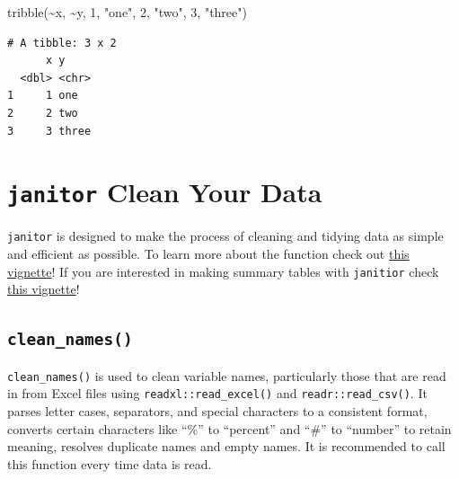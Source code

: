 \documentclass[
  letterpaper,
]{book}
\newenvironment{Shaded}{\begin{snugshade}}{\end{snugshade}}
\newcommand{\DecValTok}[1]{\textcolor[rgb]{0.68,0.00,0.00}{#1}}
\newcommand{\FunctionTok}[1]{\textcolor[rgb]{0.28,0.35,0.67}{#1}}
\newcommand{\NormalTok}[1]{\textcolor[rgb]{0.00,0.23,0.31}{#1}}
\newcommand{\SpecialCharTok}[1]{\textcolor[rgb]{0.37,0.37,0.37}{#1}}
\newcommand{\StringTok}[1]{\textcolor[rgb]{0.13,0.47,0.30}{#1}}
\begin{document}
\begin{Shaded}
\begin{Highlighting}[]
\FunctionTok{tribble}\NormalTok{(}\SpecialCharTok{\textasciitilde{}}\NormalTok{x, }\SpecialCharTok{\textasciitilde{}}\NormalTok{y,}
        \DecValTok{1}\NormalTok{, }\StringTok{"one"}\NormalTok{,}
        \DecValTok{2}\NormalTok{, }\StringTok{"two"}\NormalTok{,}
        \DecValTok{3}\NormalTok{, }\StringTok{"three"}\NormalTok{)}
\end{Highlighting}
\end{Shaded}

\begin{verbatim}
# A tibble: 3 x 2
      x y    
  <dbl> <chr>
1     1 one  
2     2 two  
3     3 three
\end{verbatim}

\hypertarget{janitor-clean-your-data}{%
\section{\texorpdfstring{\texttt{janitor} Clean Your
Data}{janitor Clean Your Data}}\label{janitor-clean-your-data}}

\texttt{janitor} is designed to make the process of cleaning and tidying
data as simple and efficient as possible. To learn more about the
function check out
\href{https://cran.r-project.org/web/packages/janitor/vignettes/janitor.html}{this
vignette}! If you are interested in making summary tables with
\texttt{janitior} check
\href{https://cran.r-project.org/web/packages/janitor/vignettes/tabyls.html}{this
vignette}!

\hypertarget{clean_names}{%
\subsection{\texorpdfstring{\texttt{clean\_names()}}{clean\_names()}}\label{clean_names}}

\texttt{clean\_names()} is used to clean variable names, particularly
those that are read in from Excel files using
\texttt{readxl::read\_excel()} and \texttt{readr::read\_csv()}. It
parses letter cases, separators, and special characters to a consistent
format, converts certain characters like ``\%'' to ``percent'' and
``\#'' to ``number'' to retain meaning, resolves duplicate names and
empty names. It is recommended to call this function every time data is
read.
\end{document}

